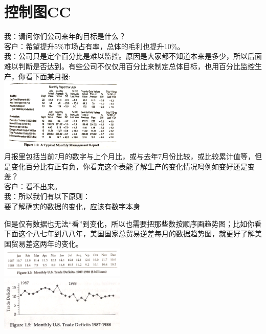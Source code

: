 \chapter{控制图CC} %

我：请问你们公司来年的目标是什么？\\
客户：希望提升5\%市场占有率，总体的毛利也提升10\%。\\
我：公司只是定个百分比是难以监控。原因是大家都不知道本来是多少，所以后面难以判断是否达到。有些公司不仅仅用百分比来制定总体目标，也用百分比监控生产，你看下面某月报:\\
\includegraphics[width=6cm]{The_key_fig111.png}\\
月报里包括当前7月的数字与上个月比，或与去年7月份比较，或比较累计值等，但是变化百分比有正有负，你看完这个表能了解生产的变化情况吗例如变好还是变差？\\
客户：看不出来。\\
我：所以我们有以下原则：\\
要了解确实的数据的变化，应该有数字本身

但是仅有数据也无法``看''到变化，所以也需要把那些数按顺序画趋势图；比如你看下面这个八七年到八八年，美国国家总贸易逆差每月的数据趋势图，就更好了解美国贸易差这两年的变化。\\
\includegraphics[width=6cm]{The_key_fig131.png}\\
\includegraphics[width=6cm]{The_key_fig151.png}\\


